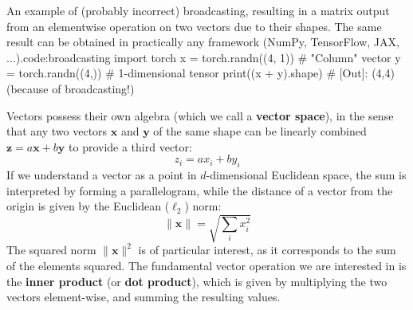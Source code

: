 \begin{mypy}{An example of (probably incorrect) broadcasting, resulting in a matrix output from an elementwise operation on two vectors due to their shapes. The same result can be obtained in practically any framework (NumPy, TensorFlow, JAX, ...).}{code:broadcasting}
import torch
x = torch.randn((4, 1))  # "Column" vector
y = torch.randn((4,))    # 1-dimensional tensor
print((x + y).shape)        
# [Out]: (4,4) (because of broadcasting!)
\end{mypy}

Vectors possess their own algebra (which we call a \textbf{vector space}), in the sense that any two vectors $\mathbf{x}$ and $\mathbf{y}$ of the same shape can be linearly combined $\mathbf{z} = a\mathbf{x} + b\mathbf{y}$ to provide a third vector:
%
$$
z_i=ax_i+by_i
$$
%
If we understand a vector as a point in $d$-dimensional Euclidean space, the sum is interpreted by forming a parallelogram, while the distance of a vector from the origin is given by the Euclidean ($\ell_2$) norm:
%
$$
\lVert \mathbf{x} \rVert=\sqrt{\sum_i x_i^2}
$$
%
The squared norm $\lVert \mathbf{x} \rVert^2$ is of particular interest, as it corresponds to the sum of the elements squared. The fundamental vector operation we are interested in is the \textbf{inner product} (or \textbf{dot product}), which is given by multiplying the two vectors element-wise, and summing the resulting values.


